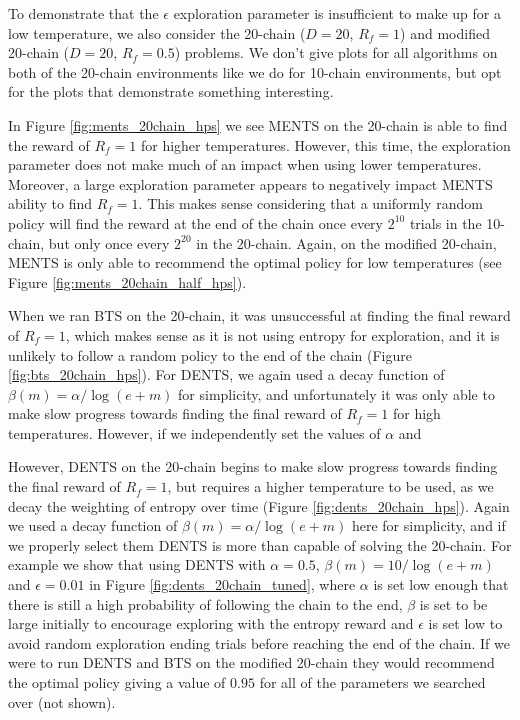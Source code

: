             To demonstrate that the $\epsilon$ exploration parameter is insufficient to make up for a low temperature, we also consider the 20-chain ($D=20$, $R_f=1$) and modified 20-chain ($D=20$, $R_f=0.5$) problems. We don't give plots for all algorithms on both of the 20-chain environments like we do for 10-chain environments, but opt for the plots that demonstrate something interesting. 
            
            In Figure \ref{fig:ments_20chain_hps} we see MENTS on the 20-chain is able to find the reward of $R_f=1$ for higher temperatures. However, this time, the exploration parameter does not make much of an impact when using lower temperatures. Moreover, a large exploration parameter appears to negatively impact MENTS ability to find $R_f=1$. This makes sense considering that a uniformly random policy will find the reward at the end of the chain once every $2^{10}$ trials in the 10-chain, but only once every $2^{20}$ in the 20-chain. Again, on the modified 20-chain, MENTS is only able to recommend the optimal policy for low temperatures (see Figure \ref{fig:ments_20chain_half_hps}). 

            When we ran BTS on the 20-chain, it was unsuccessful at finding the final reward of $R_f=1$, which makes sense as it is not using entropy for exploration, and it is unlikely to follow a random policy to the end of the chain (Figure \ref{fig:bts_20chain_hps}). For DENTS, we again used a decay function of $\beta(m)=\alpha/\log(e+m)$ for simplicity, and unfortunately it was only able to make slow progress towards finding the final reward of $R_f=1$ for high temperatures. However, if we independently set the values of $\alpha$ and 
            
            However, DENTS on the 20-chain begins to make slow progress towards finding the final reward of $R_f=1$, but requires a higher temperature to be used, as we decay the weighting of entropy over time (Figure \ref{fig:dents_20chain_hps}). Again we used a decay function of $\beta(m)=\alpha/\log(e+m)$ here for simplicity, and if we properly select them DENTS is more than capable of solving the 20-chain. For example we show that using DENTS with $\alpha=0.5$, $\beta(m)=10/\log(e+m)$ and $\epsilon=0.01$ in Figure \ref{fig:dents_20chain_tuned}, where $\alpha$ is set low enough that there is still a high probability of following the chain to the end, $\beta$ is set to be large initially to encourage exploring with the entropy reward and $\epsilon$ is set low to avoid random exploration ending trials before reaching the end of the chain. If we were to run DENTS and BTS on the modified 20-chain they would recommend the optimal policy giving a value of $0.95$ for all of the parameters we searched over (not shown).
            
